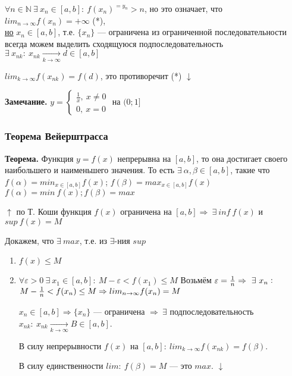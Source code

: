 \documentclass{article}
\begin{document}
    \(\forall n \in \mathbb{N}\ \exists\ x_n \in [a,b]:\ f(x_n)^{=y_n} > n\), но это означает, что \(lim_{n \rightarrow \infty} f(x_n) = +\infty\) (*),\\
    \underline{\underline{но}} \(x_n \in [a,b]\), т.е. \(\{x_n\}\) --- ограничена из ограниченной последовательности всегда можем выделить сходящуюся подпоследовательность\\
    \(\exists\ x_{nk}:\ x_{nk} \xrightarrow[k \rightarrow \infty]{} d \in [a,b]\)

    \(lim_{k \rightarrow \infty} f(x_{nk}) = f(d)\), это противоречит (*) \(\downarrow\)

    \textbf{Замечание.}
    \( y = \begin{cases}
        \frac{1}{x},\ x \neq 0\\
        0,\ x = 0
    \end{cases} \) на \( (0; 1] \)
    

    \subsubsection{Теорема Вейерштрасса}
    \textbf{Теорема.} Функция \( y = f(x) \) непрерывна на \( [a, b] \), то она достигает своего наибольшего и наименьшего значения. То есть \( \exists\ \alpha, \beta \in [a, b] \), такие что \( f(\alpha) = min_{x \in [a, b]} f(x)\); \( f(\beta) = max_{x \in [a, b]} f(x)\)
    \( f(\alpha) = min\ f(x); f(\beta) = max \)

    \(\uparrow\) по Т. Коши функция \(f(x)\) ограничена на \([a,b] \Rightarrow\ \exists\ inf\ f(x)\) и \(sup\ f(x) = M\)
    
    Докажем, что \(\exists\ max\), т.е. из \(\exists\)-ния \(sup\) 

    \begin{enumerate}
        \item \(f(x) \leq M\)
        \item \(\forall \varepsilon > 0\ \exists\ x_1 \in [a,b]:\ M - \varepsilon < f(x_1) \leq M\)
        Возьмём \(\varepsilon = \frac{1}{n} \Rightarrow\ \exists\ x_n:\\\)
        \(M - \frac{1}{n} < f(x_n) \leq M\\ \Rightarrow lim_{n \rightarrow \infty} f(x_n) = M\)

        \(x_n \in [a,b] \Rightarrow \{x_n\}\) --- ограничена \(\Rightarrow\ \exists\) подпоследовательность \(x_{nk}:\ x_{nk} \xrightarrow[k \rightarrow \infty]{} B \in [a, b]\).

        В силу непрерывности \( f(x) \) на \( [a, b]:\ lim_{k \to \infty} f(x_{nk}) = f(\beta) \).

        В силу единственности \( lim:\ f(\beta) = M \) --- это \( max \). \( \downarrow \)
    \end{enumerate}
\end{document}
